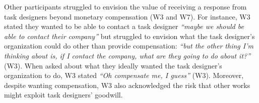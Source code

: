 Other participants struggled to envision the value of receiving a response from task designers beyond monetary compensation (W3 and W7). For instance, W3 stated they wanted to be able to contact a task designer \textit{``maybe we should be able to contact their company''} but struggled to envision what the task designer's organization could do other than provide compensation: \textit{``but the other thing I'm thinking about is, if I contact the company, what are they going to do about it?''} (W3). When asked about what they ideally wanted the task designer's organization to do, W3 stated \textit{``Oh compensate me, I guess''} (W3). Moreover, despite wanting compensation, W3 also acknowledged the risk that other works might exploit task designers' goodwill. 

